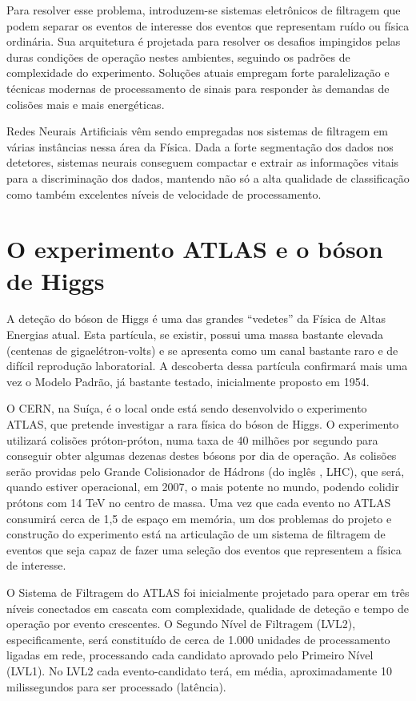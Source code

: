 Para resolver esse problema, introduzem-se sistemas eletrônicos de filtragem
que podem separar  os eventos de interesse dos eventos que
representam ruído ou física ordinária. Sua arquitetura é projetada para
resolver os desafios impingidos pelas duras condições de operação nestes
ambientes, seguindo os padrões de complexidade do experimento. Soluções atuais
empregam forte paralelização e técnicas modernas de processamento de sinais
para responder às demandas de colisões mais e mais energéticas.

Redes Neurais Artificiais vêm sendo empregadas nos sistemas de filtragem em
várias instâncias nessa área da Física. Dada a forte segmentação dos dados nos
detetores, sistemas neurais conseguem compactar e extrair as informações
vitais para a discriminação dos dados, mantendo não só a alta qualidade de
classificação como também excelentes níveis de velocidade de processamento.

\section{O experimento ATLAS e o bóson de Higgs}

A deteção do bóson de Higgs é uma das grandes ``vedetes'' da Física de Altas
Energias atual. Esta partícula, se existir, possui uma massa bastante elevada
(centenas de gigaelétron-volts) e se apresenta como um canal bastante raro e
de difícil reprodução laboratorial. A descoberta dessa partícula confirmará
mais uma vez o Modelo Padrão, já bastante testado, inicialmente proposto em
1954.

O CERN, na Suíça, é o local onde está sendo desenvolvido o experimento ATLAS,
que pretende investigar a rara física do bóson de Higgs. O experimento
utilizará colisões próton-próton, numa taxa de 40 milhões por segundo para
conseguir obter algumas dezenas destes bósons por dia de operação. As colisões
serão providas pelo Grande Colisionador de Hádrons (do inglês , LHC), que será, quando estiver operacional, em 2007, o mais
potente no mundo, podendo colidir prótons com 14 TeV no centro de massa. Uma
vez que cada evento no ATLAS consumirá cerca de 1,5  de espaço
em memória, um dos problemas do projeto e construção do experimento está na
articulação de um sistema de filtragem de eventos que seja capaz de fazer uma
seleção  dos eventos que representem a física de interesse.

O Sistema de Filtragem do ATLAS foi inicialmente projetado para
operar em três níveis conectados em cascata com complexidade, qualidade de
deteção e tempo de operação por evento crescentes. O Segundo Nível de
Filtragem (LVL2), especificamente, será constituído de cerca de 1.000 unidades
de processamento ligadas em rede, processando cada candidato aprovado pelo
Primeiro Nível (LVL1). No LVL2 cada evento-candidato terá, em média,
aproximadamente 10 milissegundos para ser processado (latência).

